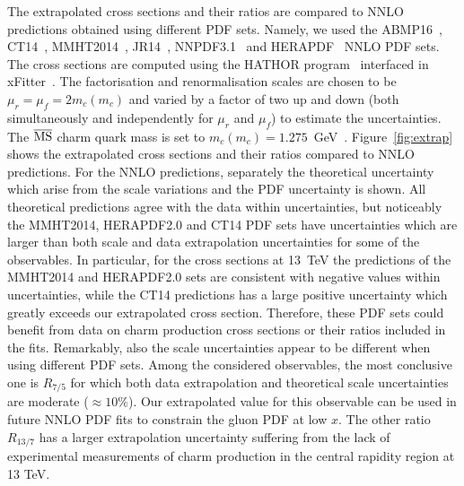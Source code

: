 \documentclass[12pt,a4paper]{article}
\newcommand{\msbar}{\ensuremath{\overline{\rm MS}}\xspace}
\begin{document}
The extrapolated cross sections and their ratios are compared to NNLO predictions obtained using different PDF sets. Namely, we used the ABMP16~\cite{Alekhin:2017kpj}, CT14~\cite{Dulat:2015mca}, MMHT2014~\cite{Harland-Lang:2014zoa}, JR14~\cite{Jimenez-Delgado:2014twa}, NNPDF3.1~\cite{Ball:2017nwa} and HERAPDF~\cite{Abramowicz:2015mha} NNLO PDF sets. The cross sections are computed using the HATHOR program~\cite{Aliev:2010zk} interfaced in xFitter~\cite{Alekhin:2014irh}.  The factorisation and renormalisation scales are chosen to be $\mu_r = \mu_f = 2m_c(m_c)$ and varied by a factor of two up and down (both simultaneously and independently for $\mu_r$ and $\mu_f$) to estimate the uncertainties. The \msbar charm quark mass is set to $m_c(m_c) = 1.275$~GeV~\cite{Tanabashi:2018oca}. Figure~\ref{fig:extrap} shows the extrapolated cross sections and their ratios compared to NNLO predictions. For the NNLO predictions, separately the theoretical uncertainty which arise from the scale variations and the PDF uncertainty is shown. All theoretical predictions agree with the data within uncertainties, but noticeably the MMHT2014, HERAPDF2.0 and CT14 PDF sets have uncertainties which are larger than both scale and data extrapolation uncertainties for some of the observables. In particular, for the cross sections at 13~TeV the predictions of the MMHT2014 and HERAPDF2.0 sets are consistent with negative values within uncertainties, while the CT14 predictions has a large positive uncertainty which greatly exceeds our extrapolated cross section. Therefore, these PDF sets could benefit from data on charm production cross sections or their ratios included in the fits. Remarkably, also the scale uncertainties appear to be different when using different PDF sets. Among the considered observables, the most conclusive one is $R_{7/5}$ for which both data extrapolation and theoretical scale uncertainties are moderate ($\approx 10\%$). Our extrapolated value for this observable can be used in future NNLO PDF fits to constrain the gluon PDF at low $x$. The other ratio $R_{13/7}$ has a larger extrapolation uncertainty suffering from the lack of experimental measurements of charm production in the central rapidity region at 13 TeV.
\end{document}

